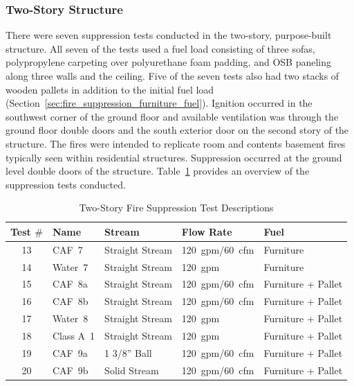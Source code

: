 \documentclass[12pt,oneside]{book}
\begin{document}
\subsubsection*{Two-Story Structure}
\label{sec:fire_supp_two}

There were seven suppression tests conducted in the two-story, purpose-built structure. All seven of the tests used a fuel load consisting of three sofas, polypropylene carpeting over polyurethane foam padding, and OSB paneling along three walls and the ceiling. Five of the seven tests also had two stacks of wooden pallets in addition to the initial fuel load (Section~\ref{sec:fire_suppression_furniture_fuel}). Ignition occurred in the southwest corner of the ground floor and available ventilation was through the ground floor double doors and the south exterior door on the second story of the structure. The fires were intended to replicate room and contents basement fires typically seen within residential structures. Suppression occurred at the ground level double doors of the structure. Table~\ref{tab:Test_Descriptions_2} provides an overview of the suppression tests conducted.

\begin{table}[!ht]
\centering
\small
\caption{Two-Story Fire Suppression Test Descriptions}\label{tab:Test_Descriptions_2}
\begin{tabular}{cllll}
\toprule[1.5pt]
Test $\#$  & Name	& Stream			& Flow Rate		& Fuel                    \\
\midrule
 13  & CAF~7     &  Straight Stream  	&  120~gpm/60~cfm   & Furniture           \\
 14  & Water~7   &  Straight Stream  	&  120~gpm    		& Furniture           \\
 15  & CAF~8a    &  Straight Stream  	&  120~gpm/60~cfm   & Furniture + Pallet  \\
 16  & CAF~8b    &  Straight Stream  	&  120~gpm/60~cfm   & Furniture + Pallet  \\
 17  & Water~8   &  Straight Stream     &  120~gpm          & Furniture + Pallet  \\
 18  & Class A~1 &  Straight Stream  	&  120~gpm		    & Furniture + Pallet  \\
 19  & CAF~9a    &  1 3/8'' Ball    	&  120~gpm/60~cfm   & Furniture + Pallet  \\
 20  & CAF~9b    &  Solid Stream        &  120~gpm/60~cfm   & Furniture + Pallet  \\
\bottomrule[1.25pt]
\end{tabular}\par
\end{table}
  
\end{document}
